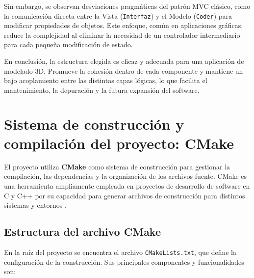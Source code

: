 Sin embargo, se observan desviaciones pragmáticas del patrón MVC clásico, como
la comunicación directa entre la Vista (\texttt{Interfaz}) y el Modelo
(\texttt{Coder}) para modificar propiedades de objetos. Este enfoque, común en
aplicaciones gráficas, reduce la complejidad al eliminar la necesidad de un
controlador intermediario para cada pequeña modificación de estado.

En conclusión, la estructura elegida es eficaz y adecuada para una aplicación
de modelado 3D. Promueve la cohesión dentro de cada componente y mantiene un
bajo acoplamiento entre las distintas capas lógicas, lo que facilita el
mantenimiento, la depuración y la futura expansión del software.

\section{Sistema de construcción y compilación del proyecto: CMake}

El proyecto utiliza \textbf{CMake} como sistema de construcción para gestionar
la compilación, las dependencias y la organización de los archivos fuente.
CMake es una herramienta ampliamente empleada en proyectos de desarrollo de
software en C y C++ por su capacidad para generar archivos de construcción para
distintos sistemas y entornos \cite{cmake-docs}.

\subsection{Estructura del archivo CMake}

En la raíz del proyecto se encuentra el archivo \texttt{CMakeLists.txt}, que
define la configuración de la construcción. Sus principales componentes y
funcionalidades son:

